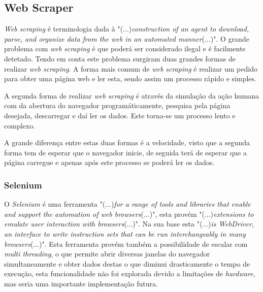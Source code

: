 \subsection{Web Scraper}
\textit{Web scraping} é terminologia dada à "(...)\emph{construction of an agent to download, parse, and organize data from the web in an automated manner}(...)"\citep{web_scraping}. O grande problema com \textit{web scraping} é que poderá ser considerado ilegal e é facilmente detetado. Tendo em conta este problema surgiram duas grandes formas de realizar \textit{web scraping}. A forma mais comum de \textit{web scraping} é realizar um pedido para obter uma página web e ler esta, sendo assim um processo rápido e simples.

A segunda forma de realizar \textit{web scraping} é através da simulação da ação humana com da abertura do navegador programáticamente, pesquisa pela página desejada, descarregar e daí ler os dados. Este torna-se um processo lento e complexo. 

A grande diferença entre estas duas formas é a velocidade, visto que a segunda forma tem de esperar que o navegador inicie, de seguida terá de esperar que a página carregue e apenas após este processo se poderá ler os dados.

\subsubsection{Selenium}

O \emph{Selenium} é uma ferramenta "(...)\emph{for a range of tools and libraries that enable and support the automation of web browsers}(...)"\citep{selenium}, esta provém "(...)\emph{extensions to emulate user interaction with browsers}(...)"\citep{selenium}. Na sua base esta "(...)\emph{is WebDriver, an interface to write instruction sets that can be run interchangeably in many browsers}(...)"\citep{selenium}. Esta ferramenta provém também a possibilidade de escalar com \textit{multi threading}, o que permite abrir diversas janelas do navegador simultaneamente e obter dados destas o que diminui drasticamente o tempo de execução, esta funcionalidade não foi explorada devido a limitações de \textit{hardware}, mas seria uma importante implementação futura.
